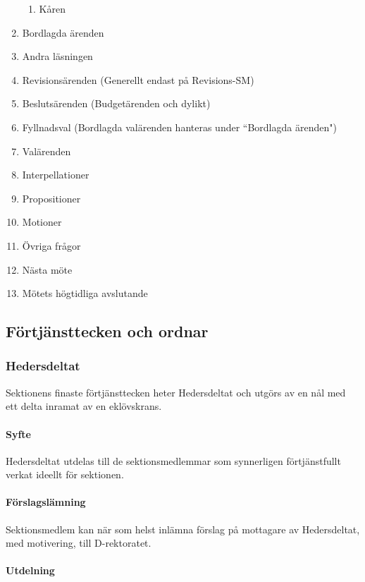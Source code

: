 \documentclass[a4paper,12pt]{article}
\begin{document}
\begin{enumerate}
\begin{enumerate}
  \item Kåren
\end{enumerate}


  \item Bordlagda ärenden
  \item Andra läsningen
  \item Revisionsärenden (Generellt endast på Revisions-SM)
  \item Beslutsärenden (Budgetärenden och dylikt)
  \item Fyllnadsval (Bordlagda valärenden hanteras under ``Bordlagda ärenden")
  \item Valärenden
  \item Interpellationer
  \item Propositioner
  \item Motioner
  \item Övriga frågor
  \item Nästa möte
  \item Mötets högtidliga avslutande
\end{enumerate}

\subsection{Förtjänsttecken och ordnar}

\subsubsection{Hedersdeltat}

Sektionens finaste förtjänsttecken heter Hedersdeltat och utgörs av en nål med ett delta inramat av en eklövskrans.

\paragraph{Syfte}

Hedersdeltat utdelas till de sektionsmedlemmar som synnerligen förtjänstfullt verkat ideellt för sektionen.

\paragraph{Förslagslämning}

Sektionsmedlem kan när som helst inlämna förslag på mottagare av Hedersdeltat, med motivering, till D-rektoratet.

\paragraph{Utdelning}
\end{document}
